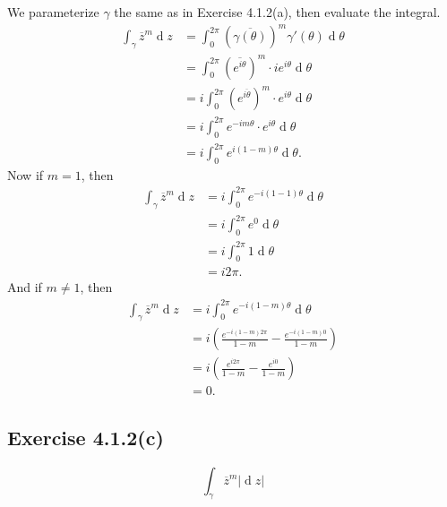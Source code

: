\documentclass[12pt]{article}
\newenvironment{problem}
    {\begin{lrbox}{\mybox}\begin{minipage}{0.98\textwidth}}
    {\end{minipage}\end{lrbox}\framebox[\textwidth]{\usebox{\mybox}}}
\newcommand{\<}{\left\langle} %
\renewcommand{\>}{\right\rangle} %
\renewcommand{\d}[1]{\operatorname{d}\!#1} %
\let\conj\overline %
\begin{document}
We parameterize $\gamma$ the same as in Exercise 4.1.2(a), then evaluate the integral.
\begin{align*}
    \int_\gamma \conj{z}^m \d{z}
        &= \int_0^{2\pi}\left(\conj{\gamma(\theta)}\right)^m\gamma'(\theta) \d{\theta} \\
        &= \int_0^{2\pi} \left(\conj{e^{i\theta}}\right)^m\cdot ie^{i\theta} \d{\theta} \\
        &= i\int_0^{2\pi} \left(e^{\conj{i\theta}}\right)^m\cdot e^{i\theta} \d{\theta} \\
        &= i\int_0^{2\pi} e^{-im\theta}\cdot e^{i\theta} \d{\theta} \\
        &= i\int_0^{2\pi} e^{i(1-m)\theta} \d{\theta}.
\end{align*}
Now if $m=1$, then
\begin{align*}
    \int_\gamma \conj{z}^m \d{z}
        &= i\int_0^{2\pi} e^{-i(1-1)\theta} \d{\theta} \\
        &= i\int_0^{2\pi} e^{0} \d{\theta}\\
        &= i\int_0^{2\pi} 1 \d{\theta}\\
        &= i2\pi.
\end{align*}
And if $m\ne1$, then
\begin{align*}
    \int_\gamma \conj{z}^m \d{z}
        &= i\int_0^{2\pi} e^{-i(1-m)\theta} \d{\theta} \\
        &= i\left(\frac{e^{-i(1-m)2\pi}}{1-m} -  \frac{e^{-i(1-m)0}}{1-m}\right)\\
        &= i\left(\frac{e^{i2\pi}}{1-m} -  \frac{e^{i0}}{1-m}\right)\\
        &= 0.
\end{align*}

\subsection*{Exercise 4.1.2(c)}
\begin{problem}
    \[\int_\gamma\conj{z}^m|\d{z}|\]
\end{problem}
\medskip
\end{document}
